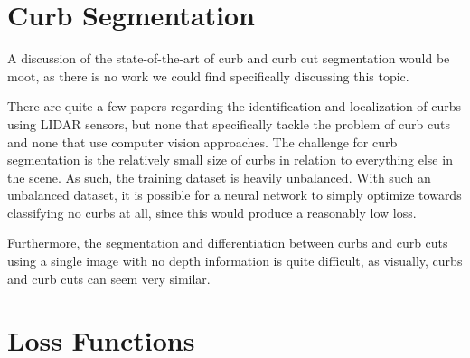 \section{Curb Segmentation}\label{section:background-curbsegmentation}
A discussion of the state-of-the-art of curb and curb cut segmentation would be moot, as there is no work we could find specifically discussing this topic.

There are quite a few papers regarding the identification and localization of curbs using LIDAR sensors, but none that specifically tackle the problem of curb cuts and none that use computer vision approaches.
The challenge for curb segmentation is the relatively small size of curbs in relation to everything else in the scene.
As such, the training dataset is heavily unbalanced.
With such an unbalanced dataset, it is possible for a neural network to simply optimize towards classifying no curbs at all, since this would produce a reasonably low loss.

Furthermore, the segmentation and differentiation between curbs and curb cuts using a single image with no depth information is quite difficult, as visually, curbs and curb cuts can seem very similar.

\section{Loss Functions}\label{section:background-loss}
